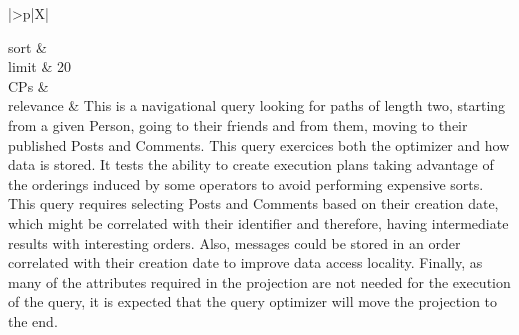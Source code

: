 \begin{tabularx}{\queryCardWidth}{|>{\queryPropertyCell}p{\queryPropertyCellWidth}|X|}
%
	
		sort		&
		\innerCardVSpace \\ \hline
	limit & 20 \\ \hline
	CPs &
	 \\ \hline
	relevance &
		\footnotesize This is a navigational query looking for paths of length two, starting from a given Person, going to their friends and
from them, moving to their published Posts and Comments. This query exercices both the optimizer and how data is
stored. It tests the ability to create execution plans taking advantage of the orderings induced by some operators to
avoid performing expensive sorts. This query requires selecting Posts and Comments based on their creation date,
which might be correlated with their identifier and therefore, having intermediate results with interesting orders.
Also, messages could be stored in an order correlated with their creation date to improve data access locality. Finally,
as many of the attributes required in the projection are not needed for the execution of the query, it is expected that
the query optimizer will move the projection to the end.
 \\ \hline%
\end{tabularx}
\queryCardVSpace

\let\emph\oldemph